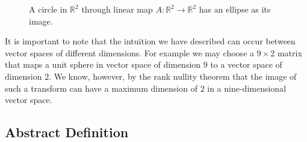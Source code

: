 \documentclass[12pt,reqno,twoside,titlepage]{article}
\theoremstyle{definition}
\theoremstyle{theorem}
\begin{document}
\begin{figure}[htb]
  \begin{centering}
  \end{centering}
  \caption{A circle in $\mathbb{R}^2$ through linear map $A:\mathbb{R}^2 \to \mathbb{R}^2$ has an ellipse as its image.}
  \label{fig:svd:1}
\end{figure}

It is important to note that the intuition we have described can occur between vector spaces of different dimensions.
For example we may choose a $9 \times 2$ matrix that maps a unit sphere in vector space of dimension $9$ to a vector space of dimension $2$.
We know, however, by the rank nullity theorem that the image of such a transform can have a maximum dimension of $2$ in a nine-dimensional vector space.

\subsection{Abstract Definition}
\cite{trefethen97}
\label{sec:svd:2}
\end{document}
